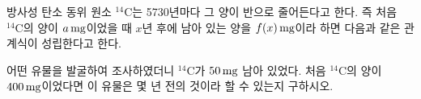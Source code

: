 방사성 탄소 동위 원소 $^{14}\mathrm{C}$는 5730년마다 그 양이 반으로 줄어든다고 한다. 즉 처음 $^{14}\mathrm{C}$의 양이 $a\mkern3mu \mathrm{mg}$이었을 때 $x$년 후에 남아 있는 양을 $f(x)\mkern3mu \mathrm{mg}$이라 하면 다음과 같은 관계식이 성립한다고 한다.\par\smallskip{}\par\smallskip\noindent 어떤 유물을 발굴하여 조사하였더니 $^{14}\mathrm{C}$가 $50\mkern3mu \mathrm{mg}$ 남아 있었다. 처음 $^{14}\mathrm{C}$의 양이 $400\mkern3mu \mathrm{mg}$이었다면 이 유물은 몇 년 전의 것이라 할 수 있는지 구하시오.

